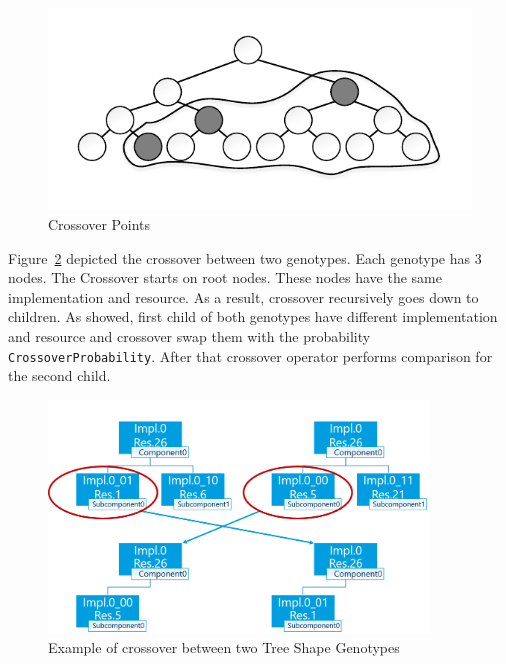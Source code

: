 \begin{figure}
	\centering
	\includegraphics[width=\textwidth]{images/CrossoverPoints.pdf}
	\caption[Crossover Points]{Crossover Points}
	\label{fig:CrossoverPoints}
\end{figure}

Figure~\ref{fig:GeneticSolverCrossover} depicted the crossover between two genotypes. Each genotype has 3 nodes. The Crossover starts on root nodes. These nodes have the same implementation and resource. As a result, crossover recursively goes down to children. As showed, first child of both genotypes have different implementation and resource and crossover swap them with the probability \texttt{CrossoverProbability}. After that crossover operator performs comparison for the second child.


\begin{figure}
	\centering
	\includegraphics[width=0.9\textwidth]{images/GeneticSolverCrossover.png}
	\caption[Crossover in Tree Shape Genotype]{Example of crossover between two Tree Shape Genotypes}
	\label{fig:GeneticSolverCrossover}
\end{figure}



